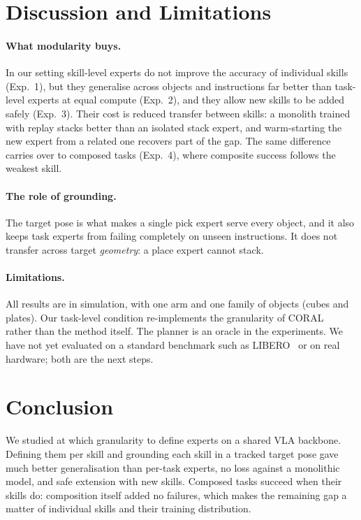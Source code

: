 \documentclass[conference]{IEEEtran}
\begin{document}
\section{Discussion and Limitations}
\paragraph{What modularity buys.}
In our setting skill-level experts do not improve the accuracy of individual skills (Exp.~1), but they generalise
across objects and instructions far better than task-level experts at equal compute (Exp.~2), and they allow new
skills to be added safely (Exp.~3). Their cost is reduced transfer between skills: a monolith trained with replay
stacks better than an isolated stack expert, and warm-starting the new expert from a related one recovers part
of the gap. The same difference carries over to composed tasks (Exp.~4), where composite success follows the weakest
skill.

\paragraph{The role of grounding.}
The target pose is what makes a single pick expert serve every object, and it also keeps task experts from failing
completely on unseen instructions. It does not transfer across target \emph{geometry}: a place expert cannot stack.

\paragraph{Limitations.}
All results are in simulation, with one arm and one family of objects (cubes and plates). Our task-level condition
re-implements the granularity of CORAL~\cite{luo2026coral} rather than the method itself. The planner is an oracle
in the experiments. We have not yet evaluated on a standard benchmark such as LIBERO~\cite{liu2023libero} or on
real hardware; both are the next steps.

\section{Conclusion}
We studied at which granularity to define experts on a shared VLA backbone. Defining them per skill and grounding
each skill in a tracked target pose gave much better generalisation than per-task experts, no loss against a
monolithic model, and safe extension with new skills. Composed tasks succeed when their skills do: composition itself added no failures,
which makes the remaining gap a matter of individual skills and their training distribution.
\end{document}

